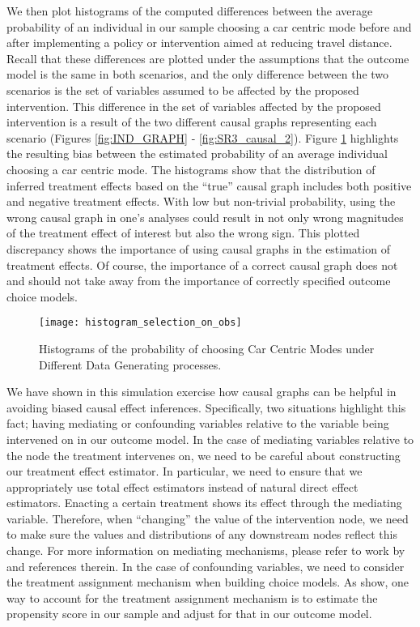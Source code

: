 We then plot histograms of the computed differences between the average probability of an individual
in our sample choosing a car centric mode before and after implementing a policy or intervention
aimed at reducing travel distance.
Recall that these differences are plotted under the assumptions that the outcome model is the same in both scenarios, and the only difference between the two scenarios is the set of variables assumed to be affected by the proposed intervention.
This difference in the set of variables affected by the proposed intervention is a result of the two different causal graphs representing each scenario (Figures \ref{fig:IND_GRAPH} - \ref{fig:SR3_causal_2}).
Figure \ref{fig:histogram_probability} highlights the resulting bias between the estimated probability of an average individual choosing a car centric mode.
The histograms show that the distribution of inferred treatment effects based on the ``true'' causal graph includes both positive and negative treatment effects.
With low but non-trivial probability, using the wrong causal graph in one's analyses could result in not only wrong magnitudes of the treatment effect of interest but also the wrong sign.
This plotted discrepancy shows the importance of using causal graphs in the estimation of treatment effects.
Of course, the importance of a correct causal graph does not and should not take away from the importance of correctly specified outcome choice models.

\begin{figure}[h!]
   \centering
   \texttt{[image: histogram\_selection\_on\_obs]}
   \caption{Histograms of the probability of choosing Car Centric Modes under Different Data Generating processes.}
   \label{fig:histogram_probability}
\end{figure}

We have shown in this simulation exercise how causal graphs can be helpful in avoiding biased causal effect inferences.
Specifically, two situations highlight this fact; having mediating or confounding variables relative to the variable being intervened on in our outcome model.
In the case of mediating variables relative to the node the treatment intervenes on, we need to be careful about constructing our treatment effect estimator.
In particular, we need to ensure that we appropriately use total effect estimators instead of natural direct effect estimators.
Enacting a certain treatment shows its effect through the mediating variable.
Therefore, when ``changing'' the value of the intervention node, we need to make sure the values and distributions of any downstream nodes reflect this change.
For more information on mediating mechanisms, please refer to work by \citet{pearl_2012_mediation} and references therein.
In the case of confounding variables, we need to consider the treatment assignment mechanism when building choice models.
As \citep{hahn_2020_bayesian} show, one way to account for the treatment assignment mechanism is to estimate the propensity score in our sample and adjust for that in our outcome model.

